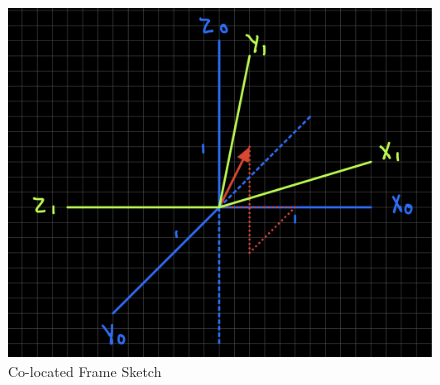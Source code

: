 \documentclass[12pt,letterpaper, onecolumn]{exam}
\begin{document}
\begin{questions}
\begin{parts}
        \begin{figure}[!h]
            \centering
            \includegraphics[scale=0.5]{assets/HW2_P5_FIG.png}
            \caption{Co-located Frame Sketch}
            \label{fig:colo}
        \end{figure}


\end{parts}
\end{questions}
\end{document}
